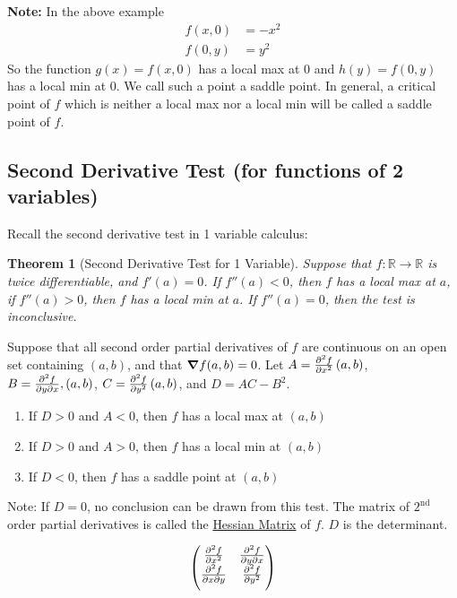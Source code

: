 \documentclass{article}
\newtheorem{theorem}{Theorem}[section]
\newcommand{\nn}{\leavevmode \newline \newline} %
\newcommand{\R}{\mathbb{R}} %
\numberwithin{equation}{subsection} %
\begin{document}
\textbf{Note: } In the above example
\begin{equation}
    \begin{split}
        f(x,0) &= -x^2 \\
        f(0,y) &= y^2
    \end{split}
\end{equation}
So the function $g(x) = f(x,0)$ has a local max at 0 and $h(y)=f(0,y)$ has a local min at 0. We call such a point a saddle point. In general, a critical point of $f$ which is neither a local max nor a local min will be called a saddle point of $f$.
\subsection{Second Derivative Test (for functions of 2 variables)}
Recall the second derivative test in 1 variable calculus:
\begin{theorem}[Second Derivative Test for 1 Variable]
Suppose that $f:\R\to\R$ is twice differentiable, and $f'(a)=0$. If $f''(a)<0$, then $f$ has a local max at $a$, if $f''(a)>0$, then $f$ has a local min at $a$. If $f''(a)=0$, then the test is inconclusive.
\end{theorem}
Suppose that all second order partial derivatives of $f$ are continuous on an open set containing $(a,b)$, and that $\grad f(a,b) = 0$. Let $A = \pdv[2]{f}{x}\,(a,b)$, $B = \pdv{f}{y}{x},(a,b)$, $C = \pdv[2]{f}{y}\,(a,b)$, and $D = AC-B^2$.
\begin{enumerate}
    \item If $D>0$ and $A<0$, then $f$ has a local max at $(a,b)$
    \item If $D>0$ and $A>0$, then $f$ has a local min at $(a,b)$
    \item If $D<0$, then $f$ has a saddle point at $(a,b)$
\end{enumerate}
Note: If $D=0$, no conclusion can be drawn from this test.
\nn
The matrix of $2^{\text{nd}}$ order partial derivatives is called the \underline{Hessian Matrix} of $f$. $D$ is the determinant.

\begin{equation}
    \begin{pmatrix}
        \pdv[2]{f}{x} & \pdv{f}{y}{x} \\ \vspace{0.5em}
        \pdv{f}{x}{y} & \pdv[2]{f}{y}
    \end{pmatrix}
\end{equation}
\end{document}
